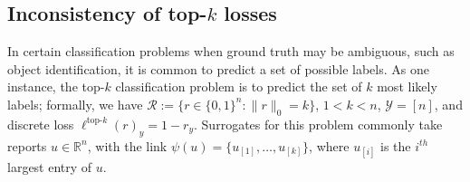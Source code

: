 \documentclass[12pt]{article}
\newcommand{\Comments}{1}
\newcommand{\mynote}[2]{\ifnum\Comments=1\textcolor{#1}{#2}\fi}
\newcommand{\mytodo}[2]{\ifnum\Comments=1%
  \todo[linecolor=#1!80!black,backgroundcolor=#1,bordercolor=#1!80!black]{#2}\fi}
\newcommand{\raf}[1]{\mynote{darkgreen}{[RF: #1]}}
\newcommand{\jessiet}[1]{\mytodo{teal!20!white}{JF: #1}}
\newcommand{\reals}{\mathbb{R}}
\newcommand{\E}{\mathbb{E}}
\newcommand{\R}{\mathcal{R}}
\newcommand{\Y}{\mathcal{Y}}
\newcommand{\risk}[1]{\underline{#1}}
\newcommand{\inprod}[2]{\langle #1, #2 \rangle}%
\newcommand{\ones}{\mathbbm{1}}
\newcommand{\Ind}[1]{\ones\{#1\}}
\newcommand{\elltopk}{\ell^{\text{top-$k$}}}
\begin{document}

\subsection{Inconsistency of top-$k$ losses}

In certain classification problems when ground truth may be ambiguous, such as object identification, it is common to predict a set of possible labels.
As one instance, the top-$k$ classification problem is to predict the set of $k$ most likely labels; formally, we have $\R := \{r \in \{0,1\}^n : \|r\|_0 = k\}$, $1<k<n$, $\Y = [n]$, and discrete loss $\elltopk(r)_y = 1-r_y$.
Surrogates for this problem commonly take reports $u\in\reals^n$, with the link $\psi(u) = \{u_{[1]},\ldots,u_{[k]}\}$, where $u_{[i]}$ is the $i^{th}$ largest entry of $u$.
\end{document}
